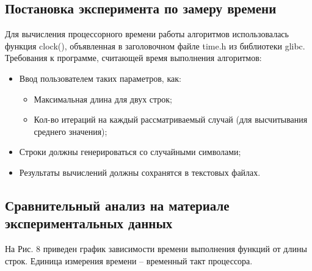 \documentclass[a4paper,12pt]{article}
\begin{document}
\newpage
\subsection{Постановка эксперимента по замеру времени}
\begin{flushleft}
Для вычисления процессорного времени работы алгоритмов использовалась функция clock(), объявленная в заголовочном файле time.h из библиотеки glibc. \\
Требования к программе, считающей время выполнения алгоритмов:
\begin{itemize}
\item Ввод пользователем таких параметров, как:
\begin{itemize}
\item Максимальная длина для двух строк;
\item Кол-во итераций на каждый рассматриваемый случай (для высчитывания среднего значения);
\end{itemize}
\item Строки должны генерироваться со случайными символами;
\item Результаты вычислений должны сохранятся в текстовых файлах.
\end{itemize}
\end{flushleft}

\newpage
\subsection{Сравнительный анализ на материале экспериментальных данных}
На Рис. 8 приведен график зависимости времени выполнения функций от длины строк. Единица измерения времени – временный такт процессора. \\
\end{document}
